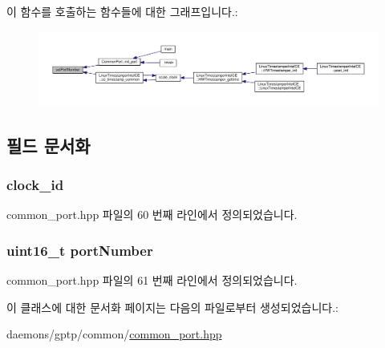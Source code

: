 이 함수를 호출하는 함수들에 대한 그래프입니다.\+:
\nopagebreak
\begin{figure}[H]
\begin{center}
\leavevmode
\includegraphics[width=350pt]{class_port_identity_a4278f191d797db9ab76799f43779498b_icgraph}
\end{center}
\end{figure}




\subsection{필드 문서화}
\subsubsection[{\texorpdfstring{clock\+\_\+id}{clock_id}}]{ clock\+\_\+id\hspace{0.3cm}{\ttfamily [private]}}\hypertarget{class_port_identity_a263e1028b568de892cf4a0b576693cbe}{}\label{class_port_identity_a263e1028b568de892cf4a0b576693cbe}


common\+\_\+port.\+hpp 파일의 60 번째 라인에서 정의되었습니다.

\subsubsection[{\texorpdfstring{port\+Number}{portNumber}}]{\setlength{\rightskip}{0pt plus 5cm}uint16\+\_\+t port\+Number\hspace{0.3cm}{\ttfamily [private]}}\hypertarget{class_port_identity_ad323c105cae25089c0f53e4fec04c080}{}\label{class_port_identity_ad323c105cae25089c0f53e4fec04c080}


common\+\_\+port.\+hpp 파일의 61 번째 라인에서 정의되었습니다.



이 클래스에 대한 문서화 페이지는 다음의 파일로부터 생성되었습니다.\+:\begin{DoxyCompactItemize}
\item 
daemons/gptp/common/\hyperlink{common__port_8hpp}{common\+\_\+port.\+hpp}\end{DoxyCompactItemize}
